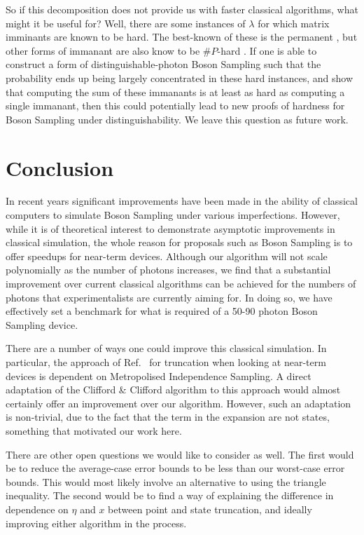 So if this decomposition does not provide us with faster classical algorithms, what might it be useful for? Well, there are some instances of $\lambda$ for which matrix imminants are known to be hard. The best-known of these is the permanent \cite{valiant1979, aaronson2011}, but other forms of immanant are also know to be $\#P$-hard \cite{hartmann1985, burgisser2000, brylinski2003, mertens2013}. If one is able to construct a form of distinguishable-photon Boson Sampling such that the probability ends up being largely concentrated in these hard instances, and show that computing the sum of these immanants is at least as hard as computing a single immanant, then this could potentially lead to new proofs of hardness for Boson Sampling under distinguishability. We leave this question as future work.

\section{Conclusion}
\label{sec:conclusion}

In recent years significant improvements have been made in the ability of classical computers to simulate Boson Sampling under various imperfections. 
However, while it is of theoretical interest to demonstrate asymptotic improvements in classical simulation, the whole reason for proposals such as Boson Sampling is to offer speedups for near-term devices. 
Although our algorithm will not scale polynomially as the number of photons increases, we find that a substantial improvement over current classical algorithms can be achieved for the numbers of photons that experimentalists are currently aiming for. 
In doing so, we have effectively set a benchmark for what is required of a 50-90 photon Boson Sampling device.

There are a number of ways one could improve this classical simulation. 
In particular, the approach of Ref.~\cite{renema2018} for truncation when looking at near-term devices is dependent on Metropolised Independence Sampling. 
A direct adaptation of the Clifford \& Clifford algorithm to this approach would almost certainly offer an improvement over our algorithm. 
However, such an adaptation is non-trivial, due to the fact that the term in the expansion are not states, something that motivated our work here.

There are other open questions we would like to consider as well. The first would be to reduce the average-case error bounds to be less than our worst-case error bounds. This would most likely involve an alternative to using the triangle inequality. The second would be to find a way of explaining the difference in dependence on $\eta$ and $x$ between point and state truncation, and ideally improving either algorithm in the process.


